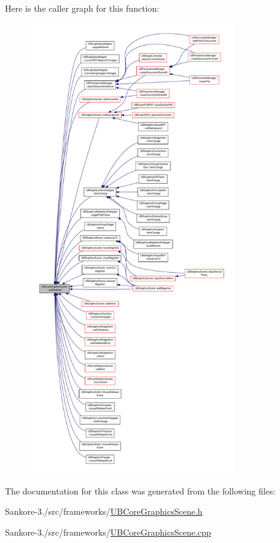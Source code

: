 Here is the caller graph for this function\-:
\nopagebreak
\begin{figure}[H]
\begin{center}
\leavevmode
\includegraphics[height=550pt]{d3/db1/class_u_b_core_graphics_scene_ad92b735788dc8e172f091a13e899b783_icgraph}
\end{center}
\end{figure}




The documentation for this class was generated from the following files\-:\begin{DoxyCompactItemize}
\item 
Sankore-\/3./src/frameworks/\hyperlink{_u_b_core_graphics_scene_8h}{U\-B\-Core\-Graphics\-Scene.\-h}\item 
Sankore-\/3./src/frameworks/\hyperlink{_u_b_core_graphics_scene_8cpp}{U\-B\-Core\-Graphics\-Scene.\-cpp}\end{DoxyCompactItemize}

